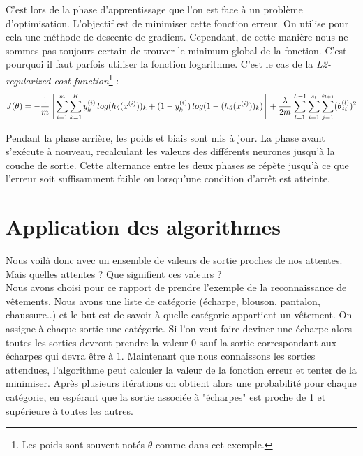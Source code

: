 	C'est lors de la phase d'apprentissage que l'on est face à un problème d'optimisation. L'objectif est de minimiser cette fonction erreur. On utilise pour cela une méthode de descente de gradient. Cependant, de cette manière nous ne sommes pas toujours certain de trouver le minimum global de la fonction. C'est pourquoi il faut parfois utiliser la fonction logarithme. C'est le cas de la \textit{L2-regularized cost function}\footnote{Les poids sont souvent notés $\theta$ comme dans cet exemple.} :
	$$J(\theta) = -{1 \over m} \left[ \sum_{i=1}^m \sum_{k=1}^K y_k^{(i)}\,log(h_\theta(x^{(i)}))_k + (1-y_k^{(i)})\,log(1 - (h_\theta(x^{(i)}))_k) \right] + {\lambda \over 2m } \sum_{l=1}^{L-1} \sum_{i=1}^{s_l} \sum_{j=1}^{s_{l+1}} (\theta_{ji}^{(l)})^2$$

	Pendant la phase arrière, les poids et biais sont mis à jour. La phase avant s'exécute à nouveau, recalculant les valeurs des différents neurones jusqu'à la couche de sortie. Cette alternance entre les deux phases se répète jusqu'à ce que l'erreur soit suffisamment faible ou lorsqu'une condition d'arrêt est atteinte.	
	
\section{Application des algorithmes}
	Nous voilà donc avec un ensemble de valeurs de sortie proches de nos attentes. Mais quelles attentes ? Que signifient ces valeurs ? \\
	
	Nous avons choisi pour ce rapport de prendre l'exemple de la reconnaissance de vêtements. Nous avons une liste de catégorie (écharpe, blouson, pantalon, chaussure..) et le but est de savoir à quelle catégorie appartient un vêtement. On assigne à chaque sortie une catégorie. Si l'on veut faire deviner une écharpe alors toutes les sorties devront prendre la valeur $0$ sauf la sortie correspondant aux écharpes qui devra être à $1$. Maintenant que nous connaissons les sorties attendues, l'algorithme peut calculer la valeur de la fonction erreur et tenter de la minimiser. Après plusieurs itérations on obtient alors une probabilité pour chaque catégorie, en espérant que la sortie associée à "écharpes" est proche de 1 et supérieure à toutes les autres.\\
	
